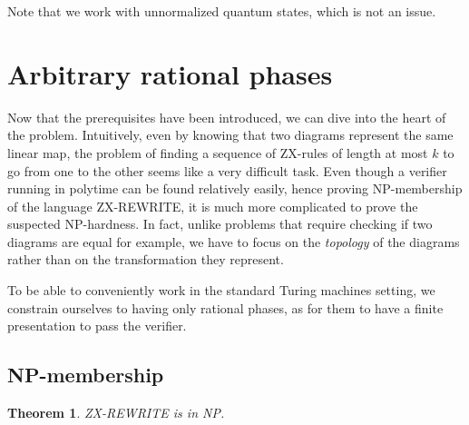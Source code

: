 \documentclass[journal,onecolumn]{IEEEtran}
\newtheorem{theorem}{Theorem}
\begin{document}
Note that we work with unnormalized quantum states, which is not an issue.


\section{Arbitrary rational phases}

Now that the prerequisites have been introduced, we can dive into the heart of the problem. Intuitively, even by knowing that two diagrams represent the same linear map, the problem of finding a sequence of ZX-rules of length at most $k$ to go from one to the other seems like a very difficult task. Even though a verifier running in polytime can be found relatively easily, hence proving \textsc{NP}-membership of the language \textsc{ZX-REWRITE}, it is much more complicated to prove the suspected NP-hardness. In fact, unlike problems that require checking if two diagrams are equal for example, we have to focus on the \textit{topology} of the diagrams rather than on the transformation they represent.

To be able to conveniently work in the standard Turing machines setting, we constrain ourselves to having only rational phases, as for them to have a finite presentation to pass the verifier.

\subsection{\textsc{NP}-membership}

\begin{theorem}{}{}
	\textsc{ZX-REWRITE} is in \textsc{NP}.	
\end{theorem}
\end{document}
